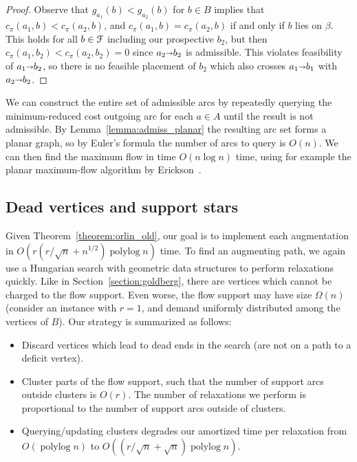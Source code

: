 \documentclass[a4paper,UKenglish]{socg-lipics-v2018}
\def\polylog{\mathop{\mathrm{polylog}}}
\def\arcto{\mathord\shortrightarrow}
\def\arc#1#2{#1\arcto#2}
\theoremstyle{plain}
\numberwithin{figure}{section}
\begin{document}
\begin{toappendix}
\begin{proof}
Observe that $g_{a_1}(b) < g_{a_2}(b)$ for $b \in B$ implies that
$c_\pi(a_1, b) < c_\pi(a_2, b)$, and $c_\pi(a_1, b) = c_\pi(a_2, b)$ if and
only if $b$ lies on $\beta$.
This holds for all $b \in \EuScript{F}$ including our prospective $b_2$,
but then $c_\pi(a_1, b_2) < c_\pi(a_2, b_2) = 0$ since $\arc{a_2}{b_2}$ is
admissible.
This violates feasibility of $\arc{a_1}{b_2}$, so there is no feasible
placement of $b_2$ which also crosses $\arc{a_1}{b_1}$ with $\arc{a_2}{b_2}$.
\end{proof}

We can construct the entire set of admissible arcs by repeatedly querying
the minimum-reduced cost outgoing arc for each $a \in A$ until the result is
not admissible.
By Lemma~\ref{lemma:admiss_planar} the resulting arc set forms a planar graph,
so by Euler's formula the number of arcs to query is $O(n)$.
We can then find the maximum flow in time $O(n\log n)$ time, using for example the
planar maximum-flow algorithm by Erickson~\cite{E10}. \cite{Other citations like Klein}

\end{toappendix}


\subsection{Dead vertices and support stars}

Given Theorem~\ref{theorem:orlin_old}, our goal is to implement each
augmentation in $O(r(r/\sqrt{n} + n^{1/2})\polylog n)$ time.
To find an augmenting path, we again use a Hungarian search with geometric data
structures to perform relaxations quickly.
Like in Section~\ref{section:goldberg}, there are vertices which cannot be
charged to the flow support.
Even worse, the flow support may have size $\Omega(n)$ (consider an instance with
$r=1$, and demand uniformly distributed among the vertices of $B$).
Our strategy is summarized as follows:
\begin{itemize}
\item Discard vertices which lead to dead ends in the search (are not on a path
	to a deficit vertex).
\item Cluster parts of the flow support, such that the number of support arcs
	outside clusters is $O(r)$.
	The number of relaxations we perform is proportional to the number of
	support arcs outside of clusters.
\item Querying/updating clusters degrades our amortized time per relaxation from $O(\polylog n)$ to $O((r/\sqrt{n}+\sqrt{n})\polylog n)$.
\end{itemize}
\end{document}

